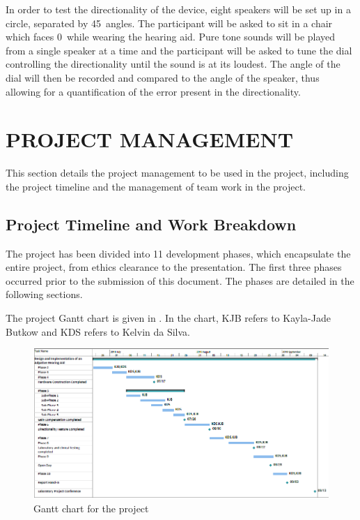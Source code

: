 \documentclass[10pt,twocolumn]{witseiepaper}
\begin{document}
In order to test the directionality of the device, eight speakers will be set up in a circle, separated by 45\textdegree\ angles. The participant will be asked to sit in a chair which faces 0\textdegree\  while wearing the hearing aid. Pure tone sounds will be played from a single speaker at a time and the participant will be asked to tune the dial controlling the directionality until the sound is at its loudest. The angle of the dial will then be recorded and compared to the angle of the speaker, thus allowing for a quantification of the error present in the directionality. 

\section{PROJECT MANAGEMENT}
This section details the project management to be used in the project, including the project timeline and the management of team work in the project.

\subsection{Project Timeline and Work Breakdown}
The project has been divided into 11 development phases, which encapsulate the entire project, from ethics clearance to the presentation. The first three phases occurred prior to the submission of this document. The phases are detailed in the following sections.

The project Gantt chart is given in . In the chart, KJB refers to Kayla-Jade Butkow and KDS refers to Kelvin da Silva.

\begin{figure}[h]
	\centering
	\includegraphics[width=1\textwidth]{GanttChart.png}
	\caption{Gantt chart for the project}
	\raggedright
	\label{fig:ganttChart}	
\end{figure}
\end{document}
